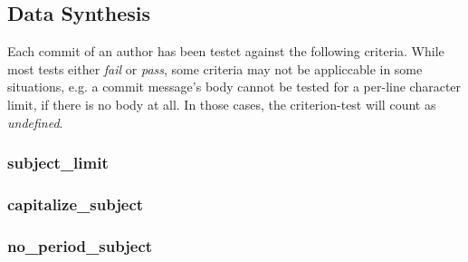 

\subsection{Data Synthesis}

%
%
%
%
%
%


Each commit of an author has been testet against the following criteria. While most tests either \emph{fail} or \emph{pass}, some criteria may not be appliccable in some situations, e.g. a commit message's body cannot be tested for a per-line character limit, if there is no body at all. In those cases, the criterion-test will count as \emph{undefined}.

\subsubsection{subject_limit}
\label{subs:subject_limit}

\subsubsection{capitalize_subject}
\label{subs:capitalize_subject}

\subsubsection{no_period_subject}
\label{subs:no_period_subject}

